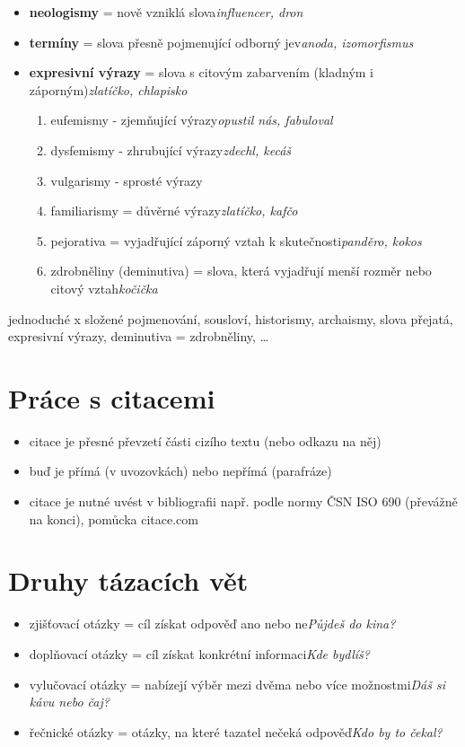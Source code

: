 \documentclass{memoir}
\begin{document}
\begin{itemize}
		\item \textbf{neologismy} = nově vzniklá slova\hfill\textit{influencer, dron}
		\item \textbf{termíny} = slova přesně pojmenující odborný jev\hfill\textit{anoda, izomorfismus}
		\item \textbf{expresivní výrazy} = slova s citovým zabarvením (kladným i záporným)\hfill\textit{zlatíčko, chlapisko}
		\begin{enumerate}
			\item eufemismy - zjemňující výrazy\hfill\textit{opustil nás, fabuloval}
			\item dysfemismy - zhrubující výrazy\hfill\textit{zdechl, kecáš}
			\item vulgarismy - sprosté výrazy
			\item familiarismy = důvěrné výrazy\hfill\textit{zlatíčko, kafčo}
			\item pejorativa = vyjadřující záporný vztah k skutečnosti\hfill\textit{panděro, kokos}
			\item zdrobněliny (deminutiva) = slova, která vyjadřují menší rozměr nebo citový vztah\hfill\textit{kočička}
		\end{enumerate}
	\end{itemize}
jednoduché x složené pojmenování, sousloví, historismy, archaismy, slova přejatá, expresivní výrazy, deminutiva = zdrobněliny, …

\section*{Práce s citacemi}
	\begin{itemize}
		\item citace je přesné převzetí části cizího textu (nebo odkazu na něj)
		\item buď je přímá (v uvozovkách) nebo nepřímá (parafráze)
		\item citace je nutné uvést v bibliografii např. podle normy ČSN ISO 690 (převážně na konci), pomůcka citace.com
	\end{itemize}

\section*{Druhy tázacích vět}
	\begin{itemize}
		\item zjišťovací otázky = cíl získat odpověď ano nebo ne\hfill\textit{Půjdeš do kina?}
		\item doplňovací otázky = cíl získat konkrétní informaci\hfill\textit{Kde bydlíš?}
		\item vylučovací otázky = nabízejí výběr mezi dvěma nebo více možnostmi\hfill\textit{Dáš si kávu nebo čaj?}
		\item řečnické otázky = otázky, na které tazatel nečeká odpověď\hfill\textit{Kdo by to čekal?}
	\end{itemize}
\end{document}
